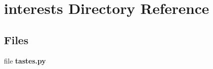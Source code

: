 \section{interests Directory Reference}
\label{dir_848c30d9f634d2ca312d43f8888f957c}
\subsection*{Files}
\begin{DoxyCompactItemize}
\item 
file {\bf tastes.\+py}
\end{DoxyCompactItemize}
